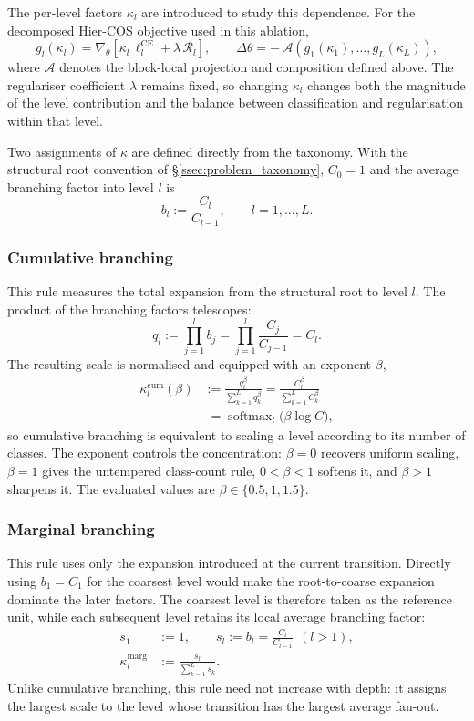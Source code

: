 The per-level factors $\kappa_l$ are introduced to study this dependence. For
the decomposed Hier-COS objective used in this ablation,
\[
g_l(\kappa_l)=\nabla_\theta\!\left[
\kappa_l\,\ell_l^{\mathrm{CE}}+\lambda\,\mathcal{R}_l
\right],
\qquad
\Delta\theta=-\,\mathcal{A}\!\left(
g_1(\kappa_1),\dots,g_L(\kappa_L)
\right),
\]
where $\mathcal{A}$ denotes the block-local projection and composition defined
above. The regulariser coefficient $\lambda$ remains fixed, so changing
$\kappa_l$ changes both the magnitude of the level contribution and the balance
between classification and regularisation within that level.

Two assignments of $\kappa$ are defined directly from the taxonomy. With the
structural root convention of \S\ref{ssec:problem_taxonomy}, $C_0=1$ and the
average branching factor into level $l$ is
\[
b_l:=\frac{C_l}{C_{l-1}},\qquad l=1,\dots,L.
\]

\subsubsection{Cumulative branching}

This rule measures the total expansion from the structural root to level $l$.
The product of the branching factors telescopes:
\[
q_l:=\prod\limits_{j=1}^{l}b_j
=\prod\limits_{j=1}^{l}\frac{C_j}{C_{j-1}}
=C_l.
\]
The resulting scale is normalised and equipped with an exponent $\beta$,
\[
\begin{aligned}
\kappa_l^{\mathrm{cum}}(\beta)
&:=\frac{q_l^\beta}{\sum_{k=1}^{L}q_k^\beta}
=\frac{C_l^\beta}{\sum_{k=1}^{L}C_k^\beta}\\[0.4ex]
&\;=\operatorname{softmax}_l\!\big(\beta\log C\big),
\end{aligned}
\]
so cumulative branching is equivalent to scaling a level according to its
number of classes. The exponent controls the concentration: $\beta=0$ recovers
uniform scaling, $\beta=1$ gives the untempered class-count rule,
$0<\beta<1$ softens it, and $\beta>1$ sharpens it. The evaluated values are
$\beta\in\{0.5,1,1.5\}$.

\subsubsection{Marginal branching}

This rule uses only the expansion introduced at the current transition.
Directly using $b_1=C_1$ for the coarsest level would make the
root-to-coarse expansion dominate the later factors. The coarsest level is
therefore taken as the reference unit, while each subsequent level retains its
local average branching factor:
\[
\begin{aligned}
s_1 &:= 1, \qquad
s_l := b_l=\frac{C_l}{C_{l-1}}\ \ (l>1), \\[0.6ex]
\kappa_l^{\mathrm{marg}} &:=\frac{s_l}{\sum_{k=1}^{L}s_k} .
\end{aligned}
\]
Unlike cumulative branching, this rule need not increase with depth: it assigns
the largest scale to the level whose transition has the largest average fan-out.

